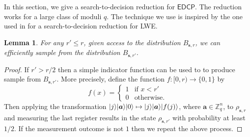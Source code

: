 \documentclass[11pt]{article}
\theoremstyle{plain}
\newtheorem{lemma}[theorem]{Lemma}
\theoremstyle{definition}
\DeclarePairedDelimiter{\ket}{\lvert}{\rangle}
\def\Z{\ensuremath{\mathbb{Z}}}
\def\edcp{\ensuremath{\mathsf{EDCP}}}
\begin{document}
In this section, we give a search-to-decision reduction for $\edcp$. The reduction works for a large class of moduli $q$. The technique we use is inspired by the one used in \cite{micciancio2012trapdoors} for a search-to-decision reduction for LWE.
\begin{lemma}
    \label{lem:small-r}
    For any $r' \le r$, given access to the distribution $B_{\bm{s}, r}$, we can efficiently sample from the distribution $B_{\bm{s}, r'}$. 
\end{lemma}
\begin{proof}
    If $r' > r / 2$ then a simple indicator function can be used to to produce sample from $B_{\bm{s}, r'}$. More precisely, define the function $f: [0, r) \rightarrow \{ 0, 1 \}$ by
    \[ f(x) = 
    \begin{cases}
        1 & \text{if } x < r' \\
        0 & \text{otherwise}.
    \end{cases} \]
    Then applying the transformation $\ket{j}\ket{\bm{a}}\ket{0} \mapsto \ket{j}\ket{\bm{a}}\ket{f(j)}$, where $\bm{a} \in \Z_q^n$, to $\rho_{\bm{s}, r}$ and measuring the last register results in the state $\rho_{\bm{s}, r'}$ with probability at least $1 / 2$. If the measurement outcome is not $1$ then we repeat the above process.


\end{proof}
\end{document}
